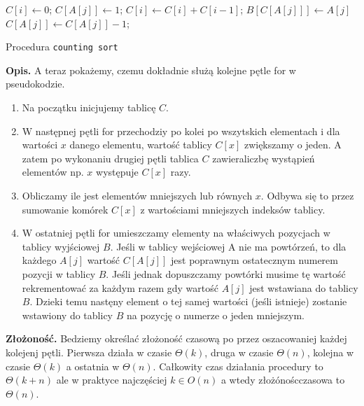 \begin{algorithm}[h]

  \DontPrintSemicolon
  
  

  
     {
    $C[i] \leftarrow 0$;
  }
      {
    $C[A[j]] \leftarrow 1$;
  }
      {
    $C[i] \leftarrow C[i]+C[i-1]$;
  }
      {
    $B[C[A[j]]] \leftarrow A[j]$\;
    $C[A[j]] \leftarrow C[A[j]]-1$;
  }
  
  \caption{Procedura \texttt{counting sort}}
  \label{alg-count}
\end{algorithm}
\textbf{Opis.}
A teraz pokażemy, czemu dokładnie służą kolejne pętle for w pseudokodzie.
\begin{enumerate}
\item Na początku inicjujemy tablicę $C$.
\item W następnej pętli for przechodziy po kolei po wszytskich elementach i dla wartości $x$ danego elementu, wartość tablicy $C[x]$ zwiększamy o jeden. A zatem po wykonaniu drugiej pętli tablica $C$ zawieraliczbę wystąpień elementów np. $x$ występuje $C[x]$ razy.
\item Obliczamy ile jest elementów mniejszych lub równych $x$. Odbywa się to przez sumowanie komórek $C[x]$ z wartościami mniejszych indeksów tablicy.
\item W ostatniej pętli for umieszczamy elementy na właściwych pozycjach w tablicy wyjściowej $B$. Jeśli w tablicy wejściowej A nie ma powtórzeń, to dla każdego $A[j]$ wartość $C[A[j]]$ jest poprawnym ostatecznym numerem pozycji w tablicy $B$. Jeśli jednak dopuszczamy powtórki musime tę wartość rekrementować za każdym razem gdy wartość $A[j]$ jest wstawiana do tablicy $B$. Dzieki temu nastęny element o tej samej wartości (jeśli istnieje) zostanie wstawiony do tablicy $B$ na pozycję o numerze o jeden mniejszym.
\end{enumerate}

\textbf{Złożoność.} 
Bedziemy określać złożoność czasową po przez oszacowaniej każdej kolejenj pętli.
Pierwsza działa w czasie $\Theta(k)$, druga w czasie $\Theta(n)$, kolejna w czasie $\Theta(k)$ a ostatnia w $\Theta(n)$.
Całkowity czas działania procedury to $\Theta(k+n)$ ale w praktyce najczęściej $k \in O(n)$ a wtedy złożónoścczasowa to \textbf{$\Theta(n)$}.

